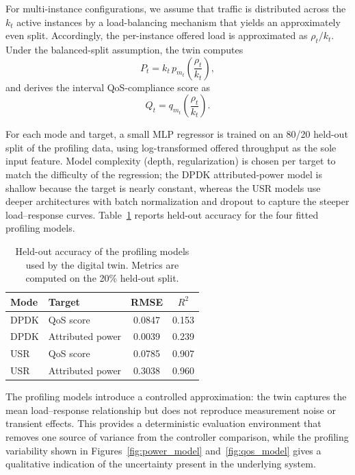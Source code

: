 \documentclass[a4paper,fleqn]{cas-sc}
\begin{document}
For multi-instance configurations, we assume that traffic is distributed across the $k_t$ active instances by a load-balancing mechanism that yields an approximately even split. Accordingly, the per-instance offered load is approximated as $\rho_t/k_t$. Under the balanced-split assumption, the twin computes
\begin{equation}
P_t = k_t\, p_{m_t}\!\left(\frac{\rho_t}{k_t}\right),
\label{eq:power_aggregate}
\end{equation}
and derives the interval QoS-compliance score as
\begin{equation}
Q_t = q_{m_t}\!\left(\frac{\rho_t}{k_t}\right).
\label{eq:qos_aggregate}
\end{equation}

For each mode and target, a small MLP regressor is trained on an 80/20 held-out split of the profiling data, using log-transformed offered throughput as the sole input feature. Model complexity (depth, regularization) is chosen per target to match the difficulty of the regression; the DPDK attributed-power model is shallow because the target is nearly constant, whereas the USR models use deeper architectures with batch normalization and dropout to capture the steeper load--response curves. Table~\ref{tab:profiling_acc} reports held-out accuracy for the four fitted profiling models.

\begin{table}[width=.9\linewidth,cols=4,pos=h]
\centering
\caption{Held-out accuracy of the profiling models used by the digital twin. Metrics are computed on the 20\% held-out split.}
\label{tab:profiling_acc}
\begin{tabular}{l l c c}
\hline
Mode & Target & RMSE & $R^2$ \\
\hline
DPDK & QoS score        & 0.0847 & 0.153 \\
DPDK & Attributed power & 0.0039 & 0.239 \\
USR  & QoS score        & 0.0785 & 0.907 \\
USR  & Attributed power & 0.3038 & 0.960 \\
\hline
\end{tabular}
\end{table}

The profiling models introduce a controlled approximation: the twin captures the mean load--response relationship but does not reproduce measurement noise or transient effects. This provides a deterministic evaluation environment that removes one source of variance from the controller comparison, while the profiling variability shown in Figures~\ref{fig:power_model} and~\ref{fig:qos_model} gives a qualitative indication of the uncertainty present in the underlying system.
\end{document}
